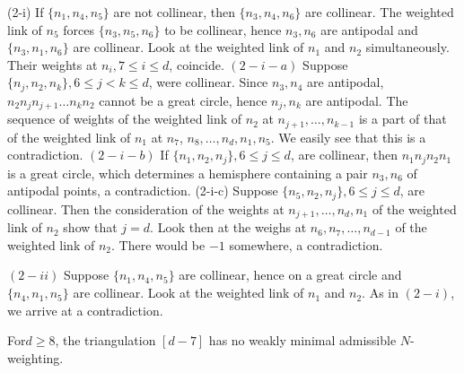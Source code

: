 \noindent
(2-i) If $\{n_1, n_4, n_5\}$ are not collinear, then $\{n_3, n_4,
n_6\}$ are collinear. The weighted link of $n_5$ forces $\{n_3, n_5,
n_6\}$ to be collinear, hence $n_3, n_6$ are antipodal and $\{n_3,
n_1, n_6\}$ are collinear. Look at the weighted link of $n_1$ and
$n_2$ simultaneously. Their weights at $n_i, 7 \leq i \leq d$,
coincide. $(2-i-a)$ Suppose $\{n_j, n_2, n_k\}, 6 \leq j < k \leq d$,
were collinear. Since $n_3, n_4$ are antipodal, $n_2 n_j
n_{j+1}\ldots n_kn_2$ cannot be a great circle, hence $n_j, n_k$ are
antipodal. The sequence of weights of the weighted link of $n_2$ at
$n_{j+1}, \ldots , n_{k-1}$ is a part of that of the weighted link of
$n_1$ at $n_7$, $n_8, \ldots , n_d, n_1, n_5$. We easily see that this
is a contradiction. $(2-i-b)$ If $\{ n_1, n_2, n_j\}, 6 \leq j \leq
d$, are collinear, then $n_1 n_j n_2n_1$ is a great circle, which
determines a hemisphere containing a pair $n_3, n_6$ of antipodal
points, a contradiction. (2-i-c) Suppose $\{n_5, n_2, n_j\}, 6 \leq j
\leq d$, are collinear. Then the consideration of the weights at
$n_{j+1}, \ldots , n_d, n_1$ of the weighted link of $n_2$ show that
$j=d$. Look then at the weighs at $n_6, n_7, \ldots, n_{d-1}$ of the
weighted link of $n_2$. There would be $-1$ somewhere, a
contradiction. 

\noindent
$(2-ii)$ Suppose $\{n_1, n_4, n_5\}$ are collinear, hence on a great
circle and $\{ n_4, n_1, n_5 \}$ are collinear. Look at the weighted link of
$n_1$ and $n_2$. As in $(2-i)$, we arrive at a contradiction. 

\begin{lemma}[Nagaya]\label{chap1:lem9.12}
 For\pageoriginale $d \geq 8$, the triangulation $[d-7]$ has no weakly
  minimal admissible $N$-weighting. 
\end{lemma}

